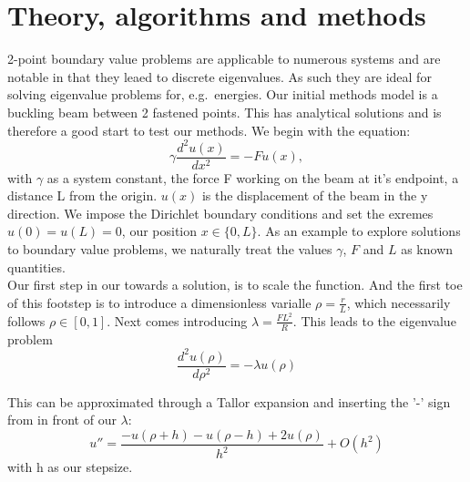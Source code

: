 \documentclass[10pt, twocolumn]{article}
\begin{document}
\section{Theory, algorithms and methods}
2-point boundary value problems are applicable to numerous systems and are notable in that they leaed to
discrete eigenvalues. As such they are ideal for solving eigenvalue problems for, e.g.\ energies.
Our initial methods model is a buckling beam between 2 fastened points. This has analytical solutions 
and is therefore a good start to test our methods. We begin with the equation\cite{project2pdf}:
\[
\gamma \frac{d^2 u(x)}{dx^2} = -F u(x),
\]
with $\gamma$ as a system constant, the force F working on the beam at it's endpoint, a distance L 
from the origin. $u(x)$ is the displacement of the beam in the y direction. We impose the 
Dirichlet boundary conditions and set the exremes $u(0) = u(L) = 0$, our position 
$x \in \{ 0, L \}$. As an example to explore solutions to boundary value problems, we naturally 
treat the values $\gamma$, $F$ and $L$ as known quantities. \\

Our first step in our towards a solution, is to scale the function. And the first toe of this 
footstep is to introduce a dimensionless varialle $ \rho = \frac{r}{L} $, which necessarily follows 
$\rho \in [0,1]$. Next comes introducing $\lambda = \frac{FL^2}{R}$. This leads to the eigenvalue 
problem
\[
\frac{d^2u(\rho )}{d\rho^2} = -\lambda u(\rho)
\]

This can be approximated through a Tallor expansion and inserting the '-' sign from in front of our 
$\lambda$:
\[
u'' = \frac{-u(\rho + h) - u(\rho - h) + 2u(\rho)}{h^2} + {O}(h^2)
\]
with h as our stepsize.
\end{document}
